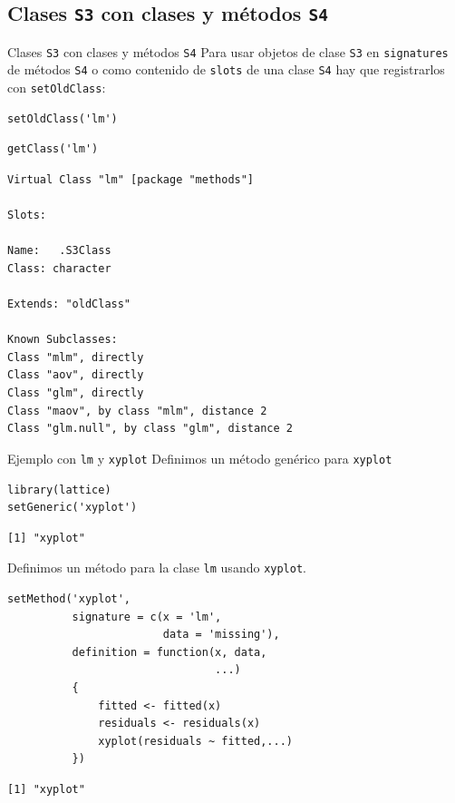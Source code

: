 \documentclass[xcolor={usenames,svgnames,dvipsnames}]{beamer}
\begin{document}
\subsection{Clases \texttt{S3} con clases y métodos \texttt{S4}}
\label{sec:orgafa44d4}

\begin{frame}[fragile,label={sec:org7ddd2d8}]{Clases \texttt{S3} con clases y métodos \texttt{S4}}
 Para usar objetos de clase \texttt{S3} en \texttt{signatures} de métodos \texttt{S4} o
como contenido de \texttt{slots} de una clase \texttt{S4} hay que registrarlos con
\texttt{setOldClass}:
\lstset{language=r,label= ,caption= ,captionpos=b,numbers=none}
\begin{lstlisting}
setOldClass('lm')
\end{lstlisting}

\lstset{language=r,label= ,caption= ,captionpos=b,numbers=none}
\begin{lstlisting}
getClass('lm')
\end{lstlisting}

\begin{verbatim}
Virtual Class "lm" [package "methods"]

Slots:
                
Name:   .S3Class
Class: character

Extends: "oldClass"

Known Subclasses: 
Class "mlm", directly
Class "aov", directly
Class "glm", directly
Class "maov", by class "mlm", distance 2
Class "glm.null", by class "glm", distance 2
\end{verbatim}
\end{frame}

\begin{frame}[fragile,label={sec:org785eb14}]{Ejemplo con \texttt{lm} y \texttt{xyplot}}
 Definimos un método genérico para \texttt{xyplot}
\lstset{language=r,label= ,caption= ,captionpos=b,numbers=none}
\begin{lstlisting}
library(lattice)
setGeneric('xyplot')
\end{lstlisting}

\begin{verbatim}
[1] "xyplot"
\end{verbatim}

Definimos un método para la clase \texttt{lm} usando \texttt{xyplot}.
\lstset{language=r,label= ,caption= ,captionpos=b,numbers=none}
\begin{lstlisting}
setMethod('xyplot',
          signature = c(x = 'lm',
                        data = 'missing'),
          definition = function(x, data,
                                ...)
          {
              fitted <- fitted(x)
              residuals <- residuals(x)
              xyplot(residuals ~ fitted,...)
          })
\end{lstlisting}

\begin{verbatim}
[1] "xyplot"
\end{verbatim}
\end{frame}
\end{document}
